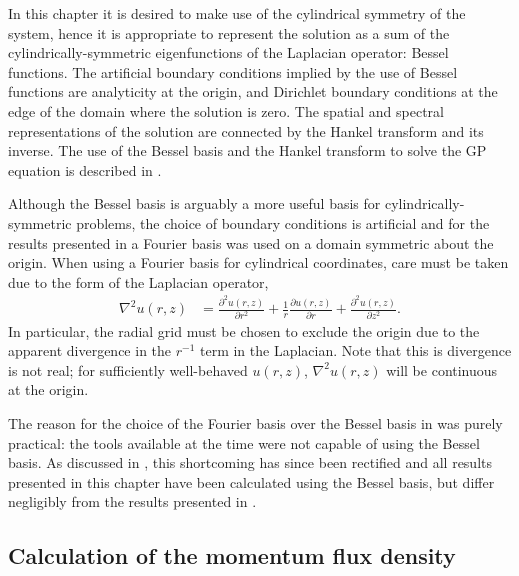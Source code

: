 In this chapter it is desired to make use of the cylindrical symmetry of the system, hence it is appropriate to represent the solution as a sum of the cylindrically-symmetric eigenfunctions of the Laplacian operator: Bessel functions. The artificial boundary conditions implied by the use of Bessel functions are analyticity at the origin, and Dirichlet boundary conditions at the edge of the domain where the solution is zero. The spatial and spectral representations of the solution are connected by the Hankel transform \citep[Chapter 15]{ArfkeyWeber} and its inverse. The use of the Bessel basis and the Hankel transform to solve the GP equation is described in \citep{Ronen:2006}.

Although the Bessel basis is arguably a more useful basis for cylindrically-symmetric problems, the choice of boundary conditions is artificial and for the results presented in \citep{Dall:2009} a Fourier basis was used on a domain symmetric about the origin. When using a Fourier basis for cylindrical coordinates, care must be taken due to the form of the Laplacian operator,
\begin{align}
    \nabla^2 u(r, z) &= \frac{\partial^2 u(r, z)}{\partial r^2} + \frac{1}{r}\frac{\partial u(r, z)}{\partial r} + \frac{\partial^2 u(r, z)}{\partial z^2}.
\end{align}
In particular, the radial grid must be chosen to exclude the origin due to the apparent divergence in the $r^{-1}$ term in the Laplacian. Note that this is divergence is not real; for sufficiently well-behaved $u(r, z)$, $\nabla^2 u(r, z)$ will be continuous at the origin.

The reason for the choice of the Fourier basis over the Bessel basis in \citep{Dall:2009} was purely practical: the tools available at the time were not capable of using the Bessel basis. As discussed in , this shortcoming has since been rectified and all results presented in this chapter have been calculated using the Bessel basis, but differ negligibly from the results presented in \citep{Dall:2009}.

\subsection{Calculation of the momentum flux density}
\label{Peaks:AbsorbingBoundaryTricks}

